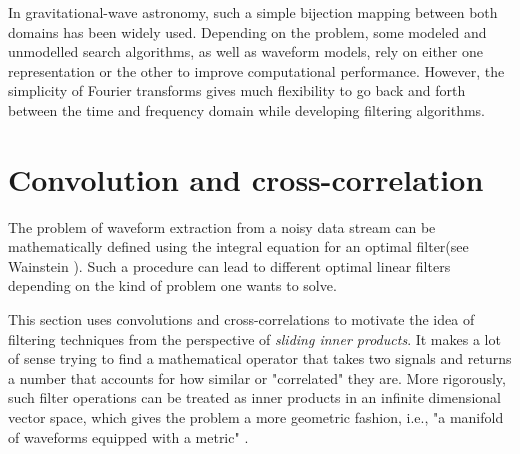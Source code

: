 \FloatBarrier

%
%
%

In gravitational-wave astronomy, such a simple bijection mapping between both domains has been widely used. Depending on the problem, some modeled and unmodelled search algorithms, as well as waveform models, rely on either one representation or the other to improve computational performance. However, the simplicity of Fourier transforms gives much flexibility to go back and forth between the time and frequency domain while developing filtering algorithms. 


\section{Convolution and cross-correlation}

The problem of waveform extraction from a noisy data stream can be mathematically defined using the integral equation for an optimal filter(see Wainstein \cite{Wainstein:1962vrq}). Such a procedure can lead to different optimal linear filters depending on the kind of problem one wants to solve. 

This section uses convolutions and cross-correlations to motivate the idea of filtering techniques from the perspective of \textit{sliding inner products}. It makes a lot of sense trying to find a mathematical operator that takes two signals and returns a number that accounts for how similar or "correlated" they are. More rigorously, such filter operations can be treated as inner products in an infinite dimensional vector space, which gives the problem a more geometric fashion, i.e., "a manifold of waveforms equipped with a metric" \cite{Andersson:2019yve,Creighton:2011zz}.

